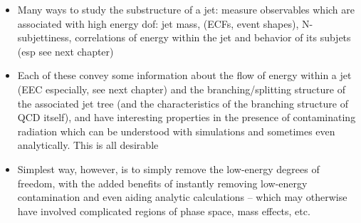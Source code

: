 \begin{itemize}
    \item
        Many ways to study the substructure of a jet:
        measure observables which are associated with high energy dof: jet mass, (ECFs, event shapes), N-subjettiness, correlations of energy within the jet and behavior of its subjets (esp see next chapter)

    \item
    Each of these convey some information about the flow of energy within a jet (EEC especially, see next chapter) and the branching/splitting structure of the associated jet tree (and the characteristics of the branching structure of QCD itself), and have interesting properties in the presence of contaminating radiation which can be understood with simulations and sometimes even analytically.
    This is all desirable



    \item
    Simplest way, however, is to simply remove the low-energy degrees of freedom, with the added benefits of instantly removing low-energy contamination and even aiding analytic calculations -- which may otherwise have involved complicated regions of phase space, mass effects, etc.
\end{itemize}





